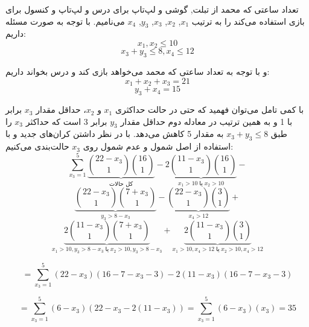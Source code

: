     \p
	تعداد ساعتی که محمد از تبلت, گوشی و لپ‌تاپ برای درس و لپ‌تاپ و کنسول برای بازی استفاده می‌کند را به ترتیب $x_1$, $x_2$, $x_3$, $y_3$, $x_4$ می‌نامیم.
    با توجه به صورت مسئله داریم:
    $$x_1, x_2 \leq 10$$
    $$x_3 + y_3 \leq 8 , x_4 \leq 12$$
    
    \p
    و با توجه به تعداد ساعتی که محمد می‌خواهد بازی کند و درس بخواند داریم:
    $$x_1 + x_2 + x_3 = 21$$
    $$y_3 + x_4 = 15$$
    
    \p
    با کمی تامل می‌توان فهمید که حتی در حالت حداکثری $x_1$ و $x_2$،
     حداقل مقدار $x_3$ برابر با  1 و به همین ترتیب در معادله دوم حداقل مقدار $y_3$ برابر 3 است که حداکثر $x_3$ را طبق $x_3 + y_3 \leq 8$ به مقدار 5 کاهش می‌دهد. با در نظر داشتن کران‌های جدید و با استفاده از اصل شمول و عدم شمول روی $x_3$ حالت‌بندی می‌کنیم:
    $$\sum\limits_{x_3 = 1}^5 \underbrace{{22 - x_3 \choose 1}{16 \choose 1}}_{\text{کل حالات}} - \underbrace{2{11 - x_3 \choose 1}{16 \choose 1}}_{x_1 > 10 \; \text{یا} \; x_2 > 10} - $$
    $$\underbrace{{22 - x_3 \choose 1}{7 + x_3 \choose 1}}_{y_3 > 8 - x_3} - \underbrace{{22 - x_3 \choose 1}{3 \choose 1}}_{x_4 > 12} + $$
    $$\underbrace{2{11 - x_3 \choose 1}{7 + x_3 \choose 1}}_{x_1 > 10, y_3 > 8 - x_3 \; \text{یا} \; x_2 > 10, y_3 > 8 - x_3} + \underbrace{2{11 - x_3 \choose 1}{3 \choose 1}}_{x_1 > 10, x_4 > 12 \; \text{یا} \; x_2 > 10, x_4 > 12}$$
    
    $$= \sum\limits_{x_3 = 1}^5 (22 - x_3)(16 - 7 - x_3 - 3) - 2(11 - x_3)(16 - 7 - x_3 - 3)$$
    
    $$= \sum\limits_{x_3 = 1}^5 (6 - x_3)(22 - x_3 - 2(11 - x_3)) = \sum\limits_{x_3 = 1}^5 (6 - x_3)(x_3) = 35$$
